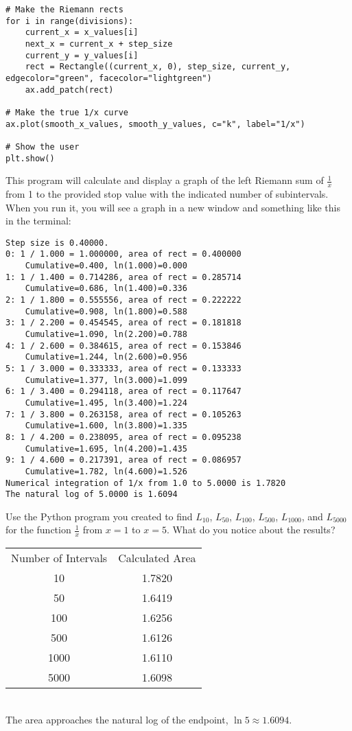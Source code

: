 \begin{Verbatim}
# Make the Riemann rects
for i in range(divisions):
    current_x = x_values[i]
    next_x = current_x + step_size
    current_y = y_values[i]
    rect = Rectangle((current_x, 0), step_size, current_y, edgecolor="green", facecolor="lightgreen")
    ax.add_patch(rect)

# Make the true 1/x curve
ax.plot(smooth_x_values, smooth_y_values, c="k", label="1/x")

# Show the user
plt.show()

\end{Verbatim}

This program will calculate and display a graph of the left Riemann sum of $\frac{1}{x}$ from 1 to the provided stop value with the indicated number of subintervals. When you run it, you will see a graph in a new window and something like this in the terminal:
\begin{Verbatim}
Step size is 0.40000.
0: 1 / 1.000 = 1.000000, area of rect = 0.400000 
	Cumulative=0.400, ln(1.000)=0.000
1: 1 / 1.400 = 0.714286, area of rect = 0.285714 
	Cumulative=0.686, ln(1.400)=0.336
2: 1 / 1.800 = 0.555556, area of rect = 0.222222 
	Cumulative=0.908, ln(1.800)=0.588
3: 1 / 2.200 = 0.454545, area of rect = 0.181818 
	Cumulative=1.090, ln(2.200)=0.788
4: 1 / 2.600 = 0.384615, area of rect = 0.153846 
	Cumulative=1.244, ln(2.600)=0.956
5: 1 / 3.000 = 0.333333, area of rect = 0.133333 
	Cumulative=1.377, ln(3.000)=1.099
6: 1 / 3.400 = 0.294118, area of rect = 0.117647 
	Cumulative=1.495, ln(3.400)=1.224
7: 1 / 3.800 = 0.263158, area of rect = 0.105263 
	Cumulative=1.600, ln(3.800)=1.335
8: 1 / 4.200 = 0.238095, area of rect = 0.095238 
	Cumulative=1.695, ln(4.200)=1.435
9: 1 / 4.600 = 0.217391, area of rect = 0.086957 
	Cumulative=1.782, ln(4.600)=1.526
Numerical integration of 1/x from 1.0 to 5.0000 is 1.7820
The natural log of 5.0000 is 1.6094
\end{Verbatim}

\begin{Exercise}[label=rsumpython]
Use the Python program you created to find $L_{10}$, $L_{50}$, $L_{100}$, $L_{500}$, $L_{1000}$, and $L_{5000}$ for the function $\frac{1}{x}$ from $x=1$ to $x=5$. What do you notice about the results?
\end{Exercise}

\begin{Answer}[ref=rsumpython]
	\begin{tabular}{c|c}
	Number of Intervals & Calculated Area\\
	10 & 1.7820 \\
	50 & 1.6419 \\
	100 & 1.6256 \\
	500 & 1.6126 \\
	1000 & 1.6110 \\
	5000 & 1.6098 \\
	\end{tabular}
	\\The area approaches the natural log of the endpoint, $\ln{5} \approx 1.6094$. 
\end{Answer}

